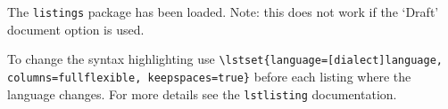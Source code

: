 The \texttt{listings} package has been loaded. Note: this does not work if the `Draft' document option is used.

To change the syntax highlighting use \verb+\lstset{language=[dialect]language, columns=fullflexible, keepspaces=true}+ before each listing where the language changes. For more details see the \texttt{lstlisting} documentation.
